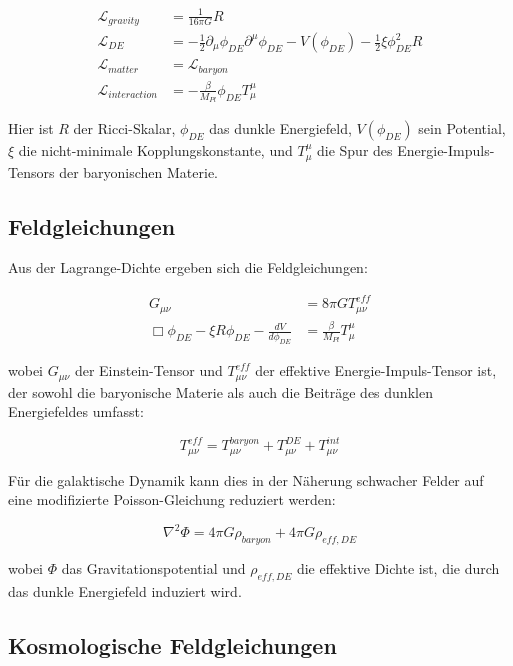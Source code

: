 \documentclass[a4paper,12pt]{article}
\begin{document}
	\begin{align}
	\mathcal{L}_{gravity} &= \frac{1}{16\pi G}R\\
	\mathcal{L}_{DE} &= -\frac{1}{2}\partial_\mu \phi_{DE} \partial^\mu \phi_{DE} - V(\phi_{DE}) - \frac{1}{2}\xi \phi_{DE}^2 R\\
	\mathcal{L}_{matter} &= \mathcal{L}_{baryon}\\
	\mathcal{L}_{interaction} &= -\frac{\beta}{M_{Pl}}\phi_{DE}T^{\mu}_{\mu}
	\end{align}
	
	Hier ist $R$ der Ricci-Skalar, $\phi_{DE}$ das dunkle Energiefeld, $V(\phi_{DE})$ sein Potential, $\xi$ die nicht-minimale Kopplungskonstante, und $T^{\mu}_{\mu}$ die Spur des Energie-Impuls-Tensors der baryonischen Materie.
	
	\subsection{Feldgleichungen}
	
	Aus der Lagrange-Dichte ergeben sich die Feldgleichungen:
	
	\begin{align}
	G_{\mu\nu} &= 8\pi G T_{\mu\nu}^{eff}\\
	\Box\phi_{DE} - \xi R \phi_{DE} - \frac{dV}{d\phi_{DE}} &= \frac{\beta}{M_{Pl}}T^{\mu}_{\mu}
	\end{align}
	
	wobei $G_{\mu\nu}$ der Einstein-Tensor und $T_{\mu\nu}^{eff}$ der effektive Energie-Impuls-Tensor ist, der sowohl die baryonische Materie als auch die Beiträge des dunklen Energiefeldes umfasst:
	
	\begin{equation}
	T_{\mu\nu}^{eff} = T_{\mu\nu}^{baryon} + T_{\mu\nu}^{DE} + T_{\mu\nu}^{int}
	\end{equation}
	
	Für die galaktische Dynamik kann dies in der Näherung schwacher Felder auf eine modifizierte Poisson-Gleichung reduziert werden:
	
	\begin{equation}
	\nabla^2 \Phi = 4\pi G \rho_{baryon} + 4\pi G \rho_{eff,DE}
	\end{equation}
	
	wobei $\Phi$ das Gravitationspotential und $\rho_{eff,DE}$ die effektive Dichte ist, die durch das dunkle Energiefeld induziert wird.
	
	\subsection{Kosmologische Feldgleichungen}
	
\end{document}
